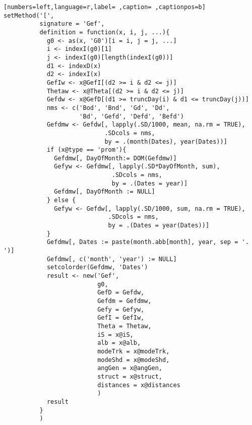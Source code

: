 \begin{lstlisting}[numbers=left,language=r,label= ,caption= ,captionpos=b]
setMethod('[',
          signature = 'Gef',
          definition = function(x, i, j, ...){
            g0 <- as(x, 'G0')[i = i, j = j, ...] 
            i <- indexI(g0)[1]
            j <- indexI(g0)[length(indexI(g0))]
            d1 <- indexD(x)
            d2 <- indexI(x)
            GefIw <- x@GefI[(d2 >= i & d2 <= j)]
            Thetaw <- x@Theta[(d2 >= i & d2 <= j)]
            Gefdw <- x@GefD[(d1 >= truncDay(i) & d1 <= truncDay(j))]
            nms <- c('Bod', 'Bnd', 'Gd', 'Dd',
                     'Bd', 'Gefd', 'Defd', 'Befd')
            Gefdmw <- Gefdw[, lapply(.SD/1000, mean, na.rm = TRUE),
                            .SDcols = nms,
                            by = .(month(Dates), year(Dates))]
            if (x@type == 'prom'){
              Gefdmw[, DayOfMonth:= DOM(Gefdmw)]
              Gefyw <- Gefdmw[, lapply(.SD*DayOfMonth, sum),
                              .SDcols = nms,
                              by = .(Dates = year)]
              Gefdmw[, DayOfMonth := NULL]
            } else {
              Gefyw <- Gefdw[, lapply(.SD/1000, sum, na.rm = TRUE),
                             .SDcols = nms,
                             by = .(Dates = year(Dates))]
            }
            Gefdmw[, Dates := paste(month.abb[month], year, sep = '. ')]
            Gefdmw[, c('month', 'year') := NULL]
            setcolorder(Gefdmw, 'Dates')
            result <- new('Gef',
                          g0,
                          GefD = Gefdw,
                          Gefdm = Gefdmw,
                          Gefy = Gefyw,
                          GefI = GefIw,
                          Theta = Thetaw,
                          iS = x@iS,
                          alb = x@alb,
                          modeTrk = x@modeTrk,
                          modeShd = x@modeShd,
                          angGen = x@angGen,
                          struct = x@struct,
                          distances = x@distances
                          )
            result
          }
          )



\end{lstlisting}
